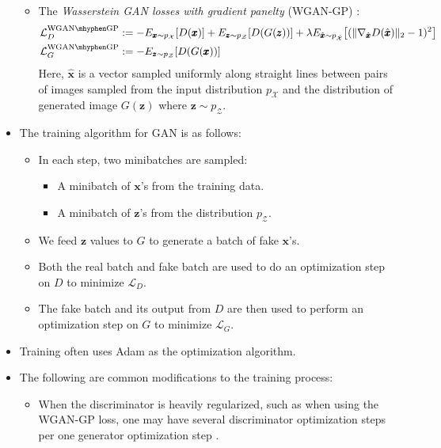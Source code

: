 \documentclass[10pt]{article}
\newcommand{\ve}[1]{\pmb{#1}}
\begin{document}
\begin{itemize}
\begin{itemize}
  		\item The \emph{Wasserstein GAN losses with gradient panelty} (WGAN-GP) \cite{Gulrajani:2017}:
  		\begin{align*}
  			\mathcal{L}^{\mathrm{WGAN\mhyphen GP}}_D 
  			&:= - E_{\ve{x} \sim p_{\mathcal{X}}} [D(\ve{x})] + E_{\ve{z} \sim p_{\mathcal{Z}}} [D(G(\ve{z}))] 
  			+ \lambda E_{\hat{\ve{x}} \sim p_{\hat{\mathcal{X}}}}\big[ (\| \nabla_{\hat{\ve{x}}} D(\hat{\ve{x}}) \|_2 -1)^2 \big]\\
  			\mathcal{L}^{\mathrm{WGAN\mhyphen GP}}_G 
  			&:= -E_{\ve{z} \sim p_{\mathcal{Z}}} [D(G(\ve{x}))]
  		\end{align*}
  		Here, $\hat{\ve{x}}$ is a vector sampled uniformly along straight lines between pairs of images sampled from the input distribution $p_{\mathcal{X}}$ and the distribution of generated image $G(\ve{z})$ where $\ve{z} \sim p_{\mathcal{Z}}.$
  	\end{itemize}

  	\item The training algorithm for GAN is as follows:
  	\begin{itemize}
      \item In each step, two minibatches are sampled:
      \begin{itemize}
        \item A minibatch of $\ve{x}$'s from the training data.
        \item A minibatch of $\ve{z}$'s from the distribution $p_{\mathcal{Z}}$.
      \end{itemize}

      \item We feed $\ve{z}$ values to $G$ to generate a batch of fake $\ve{x}$'s.

      \item Both the real batch and fake batch are used to do an optimization step on $D$ to minimize $\mathcal{L}_D$.

      \item The fake batch and its output from $D$ are then used to perform an optimization step on $G$ to minimize $\mathcal{L}_G$.
    \end{itemize}

    \item Training often uses Adam as the optimization algorithm.

    \item The following are common modifications to the training process:
    \begin{itemize}
     	\item When the discriminator is heavily regularized, such as when using the WGAN-GP loss, one may have several discriminator optimization steps per one generator optimization step \cite{Gulrajani:2017}. 


\end{itemize}
\end{itemize}
\end{document}
